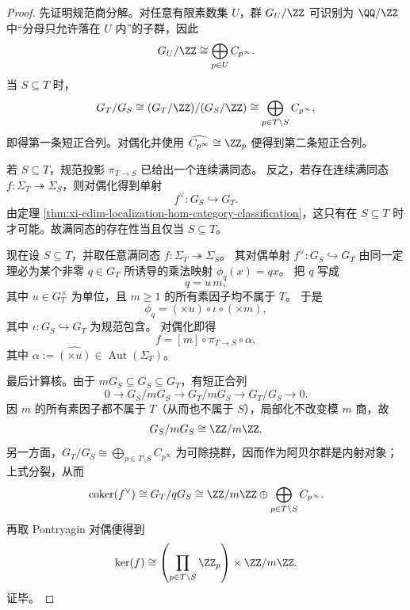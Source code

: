 \begin{proof}
先证明规范商分解。对任意有限素数集 \(U\)，群 \(G_U/\ZZ\) 可识别为 \(\QQ/\ZZ\) 中“分母只允许落在 \(U\) 内”的子群，因此
\[
G_U/\ZZ\cong \bigoplus_{p\in U} C_{p^\infty}.
\]
当 \(S\subseteq T\) 时，
\[
G_T/G_S\cong (G_T/\ZZ)/(G_S/\ZZ)\cong \bigoplus_{p\in T\setminus S} C_{p^\infty},
\]
即得第一条短正合列。对偶化并使用
\(
\widehat{C_{p^\infty}}\cong \ZZ_p
\)
便得到第二条短正合列。

若 \(S\subseteq T\)，规范投影 \(\pi_{T\to S}\) 已给出一个连续满同态。
反之，若存在连续满同态 \(f:\Sigma_T\twoheadrightarrow \Sigma_S\)，则对偶化得到单射
\[
f^\vee:G_S\hookrightarrow G_T.
\]
由定理 \ref{thm:xi-cdim-localization-hom-category-classification}，这只有在 \(S\subseteq T\) 时才可能。故满同态的存在性当且仅当 \(S\subseteq T\)。

现在设 \(S\subseteq T\)，并取任意满同态 \(f:\Sigma_T\twoheadrightarrow \Sigma_S\)。
其对偶单射 \(f^\vee:G_S\hookrightarrow G_T\) 由同一定理必为某个非零 \(q\in G_T\) 所诱导的乘法映射 \(\phi_q(x)=qx\)。
把 \(q\) 写成
\[
q=u\,m,
\]
其中 \(u\in G_T^\times\) 为单位，且 \(m\ge 1\) 的所有素因子均不属于 \(T\)。
于是
\[
\phi_q=(\times u)\circ \iota\circ (\times m),
\]
其中 \(\iota:G_S\hookrightarrow G_T\) 为规范包含。
对偶化即得
\[
f=[m]\circ \pi_{T\to S}\circ \alpha,
\]
其中 \(\alpha:=\widehat{(\times u)}\in\operatorname{Aut}(\Sigma_T)\)。

最后计算核。由于 \(mG_S\subseteq G_S\subseteq G_T\)，有短正合列
\[
0\longrightarrow G_S/mG_S\longrightarrow G_T/mG_S\longrightarrow G_T/G_S\longrightarrow 0.
\]
因 \(m\) 的所有素因子都不属于 \(T\)（从而也不属于 \(S\)），局部化不改变模 \(m\) 商，故
\[
G_S/mG_S\cong \ZZ/m\ZZ.
\]
另一方面，\(G_T/G_S\cong \bigoplus_{p\in T\setminus S} C_{p^\infty}\) 为可除挠群，因而作为阿贝尔群是内射对象；上式分裂，从而
\[
\operatorname{coker}(f^\vee)\cong G_T/qG_S\cong \ZZ/m\ZZ\oplus \bigoplus_{p\in T\setminus S} C_{p^\infty}.
\]
再取 Pontryagin 对偶便得到
\[
\ker(f)\cong
\left(\prod_{p\in T\setminus S}\ZZ_p\right)\times \ZZ/m\ZZ.
\]
证毕。
\end{proof}

